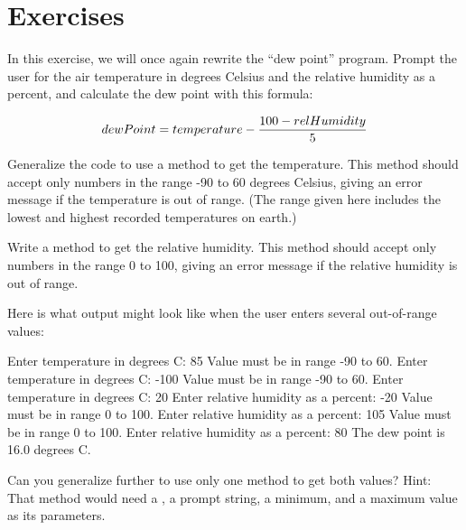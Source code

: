 \section{Exercises}

\begin{exercise}
In this exercise, we will once again rewrite the ``dew point'' program. Prompt the user for the air temperature in degrees Celsius and the relative humidity as a percent, and calculate the dew point with this formula:

\begin{equation*}
dewPoint = temperature - {{100 - relHumidity} \over 5}
\end{equation*}

Generalize the code to use a method to get the temperature. This method should accept only numbers in the range -90 to 60 degrees Celsius, giving an error message if the temperature is out of range. (The range given here includes the lowest and highest recorded temperatures on earth.)

Write a method to get the relative humidity. This method should accept only numbers in the range 0 to 100, giving an error message if the relative humidity is out of range.

Here is what output might look like when the user enters several out-of-range values:

\begin{stdout}
Enter temperature in degrees C: 85
Value must be in range -90 to 60.
Enter temperature in degrees C: -100
Value must be in range -90 to 60.
Enter temperature in degrees C: 20
Enter relative humidity as a percent: -20
Value must be in range 0 to 100.
Enter relative humidity as a percent: 105
Value must be in range 0 to 100.
Enter relative humidity as a percent: 80
The dew point is 16.0 degrees C.
\end{stdout}

Can you generalize further to use only one method to get both values?  Hint: That method would need a , a prompt string, a minimum, and a maximum value as its parameters.
\end{exercise}

